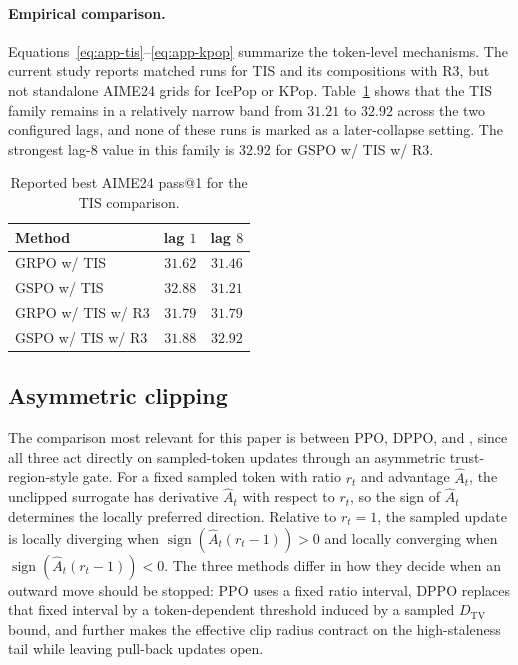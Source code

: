 \paragraph{Empirical comparison.}
Equations~\eqref{eq:app-tis}--\eqref{eq:app-kpop} summarize the token-level mechanisms. The current study reports matched runs for TIS and its compositions with R3, but not standalone AIME24 grids for IcePop or KPop. Table~\ref{tab:app-exp-tis} shows that the TIS family remains in a relatively narrow band from $31.21$ to $32.92$ across the two configured lags, and none of these runs is marked as a later-collapse setting. The strongest lag-$8$ value in this family is $32.92$ for GSPO w/ TIS w/ R3.

\begin{table}[h]
\centering
\caption{Reported best AIME24 pass@1 for the TIS comparison.}
\label{tab:app-exp-tis}
\small
\begin{tabular}{@{}lcc@{}}
\toprule
Method & lag $1$ & lag $8$ \\
\midrule
GRPO w/ TIS & $31.62$ & $31.46$ \\
GSPO w/ TIS & $32.88$ & $31.21$ \\
GRPO w/ TIS w/ R3 & $31.79$ & $31.79$ \\
GSPO w/ TIS w/ R3 & $31.88$ & $32.92$ \\
\bottomrule
\end{tabular}
\end{table}

\subsection{Asymmetric clipping}
\label{app:asymclip}

The comparison most relevant for this paper is between PPO, DPPO, and \satr{}, since all three act directly on sampled-token updates through an asymmetric trust-region-style gate. For a fixed sampled token with ratio $r_t$ and advantage $\hat A_t$, the unclipped surrogate has derivative $\hat A_t$ with respect to $r_t$, so the sign of $\hat A_t$ determines the locally preferred direction. Relative to $r_t=1$, the sampled update is locally diverging when $\operatorname{sign}(\hat A_t(r_t-1))>0$ and locally converging when $\operatorname{sign}(\hat A_t(r_t-1))<0$. The three methods differ in how they decide when an outward move should be stopped: PPO uses a fixed ratio interval, DPPO replaces that fixed interval by a token-dependent threshold induced by a sampled $D_{\mathrm{TV}}$ bound, and \satr{} further makes the effective clip radius contract on the high-staleness tail while leaving pull-back updates open.

